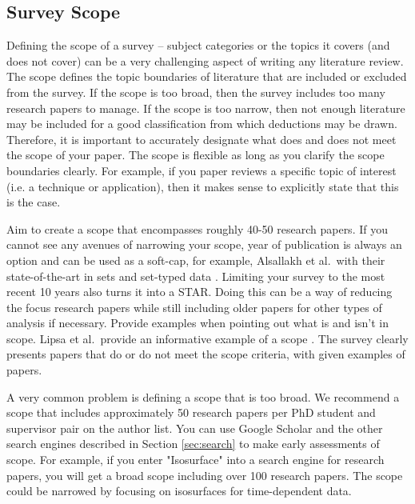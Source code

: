 \subsection{Survey Scope} \label{sec:scope}
Defining the scope of a survey -- subject categories or the topics it covers (and does not cover) can be a very challenging aspect of writing any literature review. The scope defines the topic boundaries of literature that are included or excluded from the survey. If the scope is too broad, then the survey includes too many research papers to manage. If the scope is too narrow, then not enough literature may be included for a good classification from which deductions may be drawn. Therefore, it is important to accurately designate what does and does not meet the scope of your paper. The scope is flexible as long as you clarify the scope boundaries clearly. For example, if you paper reviews a specific topic of interest (i.e. a technique or application), then it makes sense to explicitly state that this is the case.

Aim to create a scope that encompasses roughly 40-50 research papers. If you cannot see any avenues of narrowing your scope, year of publication is always an option and can be used as a soft-cap, for example, Alsallakh et al.\ with their state-of-the-art in sets and set-typed data \cite{alsallakh2014visualising}. Limiting your survey to the most recent 10 years also turns it into a STAR. Doing this can be a way of reducing the focus research papers while still including older papers for other types of analysis if necessary. Provide examples when pointing out what is and isn't in scope. Lipsa et al.\ provide an informative example of a scope \cite{lipsa2012visualization}. The survey clearly presents papers that do or do not meet the scope criteria, with given examples of papers.

A very common problem is defining a scope that is too broad. We recommend a scope that includes approximately 50 research papers per PhD student and supervisor pair on the author list. You can use Google Scholar and the other search engines described in Section \ref{sec:search} to make early assessments of scope. For example, if you enter "Isosurface" into a search engine for research papers, you will get a broad scope including over 100 research papers. The scope could be narrowed by focusing on isosurfaces for time-dependent data.

